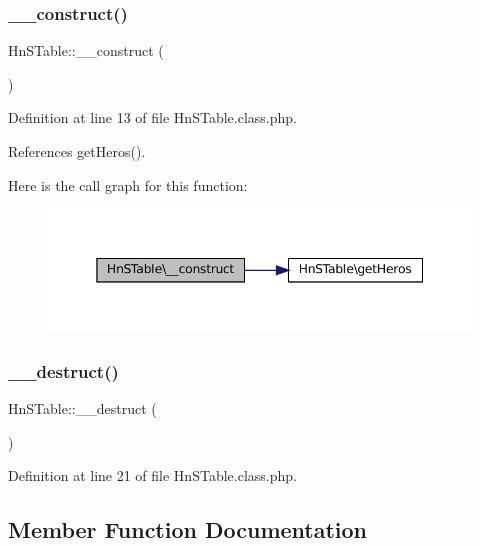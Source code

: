 \subsubsection{\texorpdfstring{\+\_\+\+\_\+construct()}{\_\_construct()}}
{\footnotesize\ttfamily Hn\+S\+Table\+::\+\_\+\+\_\+construct (\begin{DoxyParamCaption}{ }\end{DoxyParamCaption})}



Definition at line 13 of file Hn\+S\+Table.\+class.\+php.



References get\+Heros().

Here is the call graph for this function\+:\nopagebreak
\begin{figure}[H]
\begin{center}
\leavevmode
\includegraphics[width=345pt]{class_hn_s_table_a351eae2ab4dcd8fcb12d310666372177_cgraph}
\end{center}
\end{figure}
\mbox{\label{class_hn_s_table_ab960a63d8ef9e904bb1de0eb82a6092f}} 
\subsubsection{\texorpdfstring{\+\_\+\+\_\+destruct()}{\_\_destruct()}}
{\footnotesize\ttfamily Hn\+S\+Table\+::\+\_\+\+\_\+destruct (\begin{DoxyParamCaption}{ }\end{DoxyParamCaption})}



Definition at line 21 of file Hn\+S\+Table.\+class.\+php.



\subsection{Member Function Documentation}
\mbox{\label{class_hn_s_table_ad8c27691481cf504e4c9e0a63f9aa6e9}} 
